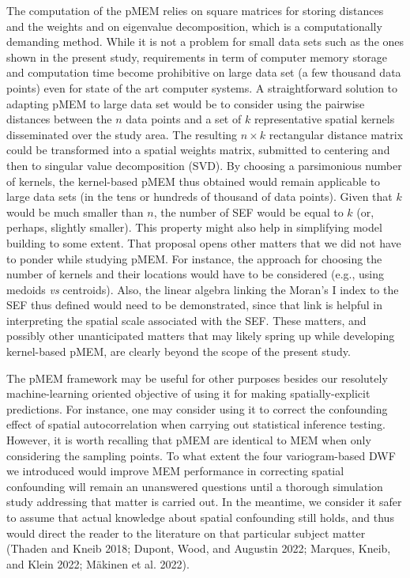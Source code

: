 \documentclass[
]{article}
\begin{document}
The computation of the pMEM relies on square matrices for storing
distances and the weights and on eigenvalue decomposition, which is a
computationally demanding method. While it is not a problem for small
data sets such as the ones shown in the present study, requirements in
term of computer memory storage and computation time become prohibitive
on large data set (a few thousand data points) even for state of the art
computer systems. A straightforward solution to adapting pMEM to large
data set would be to consider using the pairwise distances between the
\(n\) data points and a set of \(k\) representative spatial kernels
disseminated over the study area. The resulting \(n \times k\)
rectangular distance matrix could be transformed into a spatial weights
matrix, submitted to centering and then to singular value decomposition
(SVD). By choosing a parsimonious number of kernels, the kernel-based
pMEM thus obtained would remain applicable to large data sets (in the
tens or hundreds of thousand of data points). Given that \(k\) would be
much smaller than \(n\), the number of SEF would be equal to \(k\) (or,
perhaps, slightly smaller). This property might also help in simplifying
model building to some extent. That proposal opens other matters that we
did not have to ponder while studying pMEM. For instance, the approach
for choosing the number of kernels and their locations would have to be
considered (e.g., using medoids \emph{vs} centroids). Also, the linear
algebra linking the Moran's I index to the SEF thus defined would need
to be demonstrated, since that link is helpful in interpreting the
spatial scale associated with the SEF. These matters, and possibly other
unanticipated matters that may likely spring up while developing
kernel-based pMEM, are clearly beyond the scope of the present study.

The pMEM framework may be useful for other purposes besides our
resolutely machine-learning oriented objective of using it for making
spatially-explicit predictions. For instance, one may consider using it
to correct the confounding effect of spatial autocorrelation when
carrying out statistical inference testing. However, it is worth
recalling that pMEM are identical to MEM when only considering the
sampling points. To what extent the four variogram-based DWF we
introduced would improve MEM performance in correcting spatial
confounding will remain an unanswered questions until a thorough
simulation study addressing that matter is carried out. In the meantime,
we consider it safer to assume that actual knowledge about spatial
confounding still holds, and thus would direct the reader to the
literature on that particular subject matter (Thaden and Kneib 2018;
Dupont, Wood, and Augustin 2022; Marques, Kneib, and Klein 2022; Mäkinen
et al. 2022).
\end{document}
